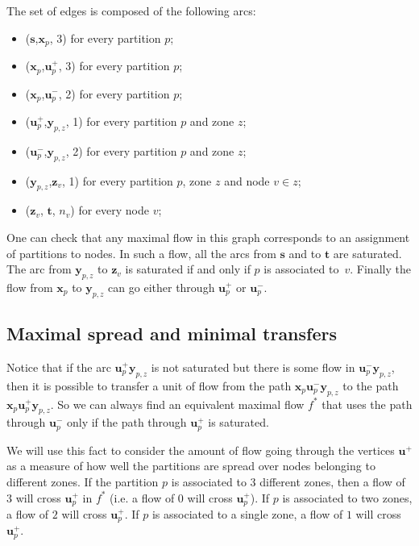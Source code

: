 \documentclass[]{article}
\begin{document}
The set of edges is composed of the following arcs:
\begin{itemize}
	\item ($\mathbf{s}$,$\mathbf{x}_p$, 3) for every partition $p$;
	\item ($\mathbf{x}_p$,$\mathbf{u}^+_p$, 3) for every partition $p$;
	\item ($\mathbf{x}_p$,$\mathbf{u}^-_p$, 2) for every partition $p$;
	\item ($\mathbf{u}^+_p$,$\mathbf{y}_{p,z}$, 1) for every partition $p$ and zone $z$;
	\item ($\mathbf{u}^-_p$,$\mathbf{y}_{p,z}$, 2) for every partition $p$ and zone $z$;
	\item ($\mathbf{y}_{p,z}$,$\mathbf{z}_v$, 1) for every partition $p$, zone $z$ and node $v\in z$;
	\item ($\mathbf{z}_v$, $\mathbf{t}$, $n_v$) for every node $v$;
\end{itemize}

One can check that any maximal flow in this graph corresponds to an assignment of partitions to nodes. In such a flow, all the arcs from $\mathbf{s}$ and to $\mathbf{t}$ are saturated. The arc from $\mathbf{y}_{p,z}$ to $\mathbf{z}_v$ is saturated if and only if $p$ is associated to~$v$. 
Finally the flow from $\mathbf{x}_p$ to $\mathbf{y}_{p,z}$ can go either through $\mathbf{u}^+_p$ or $\mathbf{u}^-_p$.



\subsection{Maximal spread and minimal transfers}
Notice that if the arc $\mathbf{u}_p^+\mathbf{y}_{p,z}$ is not saturated but there is some flow in $\mathbf{u}_p^-\mathbf{y}_{p,z}$, then it is possible to transfer a unit of flow from the path  $\mathbf{x}_p\mathbf{u}_p^-\mathbf{y}_{p,z}$ to the path $\mathbf{x}_p\mathbf{u}_p^+\mathbf{y}_{p,z}$. So we can always find an equivalent maximal flow $f^*$ that uses the path through $\mathbf{u}_p^-$ only if the path through $\mathbf{u}_p^+$ is saturated.

We will use this fact to consider the amount of flow going through the vertices $\mathbf{u}^+$ as a measure of how well the partitions are spread over nodes belonging to different zones. If the partition $p$ is associated to 3 different zones, then a flow of 3 will cross $\mathbf{u}_p^+$ in $f^*$ (i.e. a flow of 0 will cross $\mathbf{u}_p^+$). If $p$ is associated to two zones, a flow of $2$ will cross $\mathbf{u}_p^+$. If $p$ is associated to a single zone, a flow of $1$ will cross $\mathbf{u}_p^+$.
\end{document}
